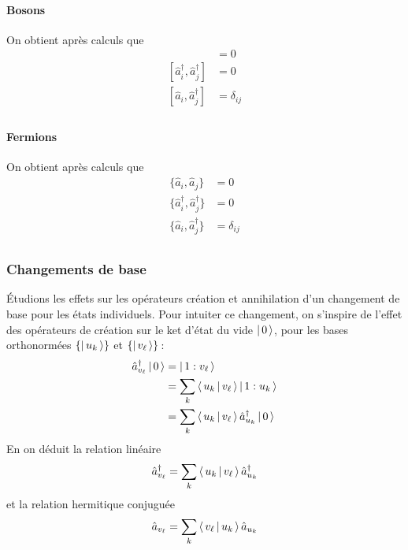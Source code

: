             \paragraph{Bosons}

            On obtient après calculs que 
            \begin{align*}
                [\hat{a}_i, \hat{a}_j] &= 0 \\
                [\hat{a}_i^{\dagger}, \hat{a}_j^{\dagger}] &= 0 \\
                [\hat{a}_i, \hat{a}_j^{\dagger}] &= \delta_{ij} \\
            \end{align*}

            \paragraph{Fermions}

            On obtient après calculs que 
            \begin{align*}
                \{\hat{a}_i, \hat{a}_j\} &= 0 \\
                \{\hat{a}_i^{\dagger}, \hat{a}_j^{\dagger}\} &= 0 \\
                \{\hat{a}_i, \hat{a}_j^{\dagger}\} &= \delta_{ij} \\
            \end{align*}

        \subsubsection{Changements de base}

        Étudions les effets sur les opérateurs création et annihilation d’un changement de base pour les états individuels. Pour intuiter ce changement, on s’inspire de l’effet des opérateurs de création sur le ket d’état du vide $\left| \, 0 \, \right>$, pour les bases orthonormées $\left\{\left| \, u_k \, \right>\right\}$ et $\left\{\left| \, v_{\ell} \, \right>\right\}$ :
            \begin{align*}
                \hat{a}_{v_{\ell}}^{\dagger} \left| \, 0 \, \right> 
                &= \left| \, 1:v_{\ell} \, \right> \\
                &= \sum_{k} \left< \, u_{k} \, \middle| \, v_{\ell} \, \right> \left| \, 1: u_{k} \, \right> \\
                &= \sum_{k} \left< \, u_k \, \middle| \, v_{\ell} \, \right> \hat{a}_{u_k}^{\dagger} \left| \, 0 \, \right>
            \end{align*}
        En on déduit la relation linéaire 
        \[ \hat{a}_{v_{\ell}}^{\dagger} = \sum_{k} \left< \, u_k \, \middle| \, v_{\ell} \, \right> \hat{a}_{u_k}^{\dagger} \]   
        et la relation hermitique conjuguée 
        \[ \hat{a}_{v_{\ell}} = \sum_{k} \left< \, v_{\ell} \, \middle| \, u_k \, \right> \hat{a}_{u_k}\]  
            
